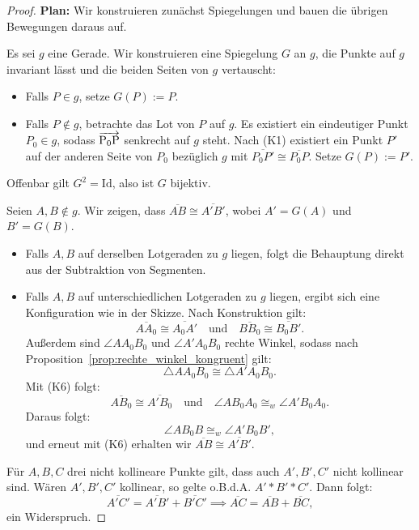 \documentclass[a4paper,12pt]{article}
\theoremstyle{break}
\begin{document}
\begin{proof}
\textbf{Plan:} Wir konstruieren zunächst Spiegelungen und bauen die übrigen Bewegungen daraus auf.

Es sei \(g\) eine Gerade. Wir konstruieren eine Spiegelung \(G\) an \(g\), die Punkte auf \(g\) invariant lässt und die beiden Seiten von \(g\) vertauscht:
\begin{itemize}
    \item Falls \(P \in g\), setze \(G(P) := P\).
    \item Falls \(P \notin g\), betrachte das Lot von \(P\) auf \(g\). Es existiert ein eindeutiger Punkt \(P_0 \in g\), sodass \(\overrightarrow{\rm P_0P}\) senkrecht auf \(g\) steht.  
    Nach (K1) existiert ein Punkt \(P'\) auf der anderen Seite von \(P_0\) bezüglich \(g\) mit \(\overline{P_0P'} \cong \overline{P_0P}\). Setze \(G(P) := P'\).
\end{itemize}

Offenbar gilt \(G^2 = \text{Id}\), also ist \(G\) bijektiv.  

Seien \(A, B \notin g\). Wir zeigen, dass \(\overline{AB} \cong \overline{A'B'}\), wobei \(A' = G(A)\) und \(B' = G(B)\).
\begin{itemize}
    \item Falls \(A, B\) auf derselben Lotgeraden zu \(g\) liegen, folgt die Behauptung direkt aus der Subtraktion von Segmenten.
    \item Falls \(A, B\) auf unterschiedlichen Lotgeraden zu \(g\) liegen, ergibt sich eine Konfiguration wie in der Skizze.  
    Nach Konstruktion gilt:
    \[
    \overline{AA_0} \cong \overline{A_0A'} \quad \text{und} \quad \overline{BB_0} \cong \overline{B_0B'}.
    \]
    Außerdem sind \(\angle AA_0B_0\) und \(\angle A'A_0B_0\) rechte Winkel, sodass nach Proposition~\ref{prop:rechte_winkel_kongruent} gilt:
    \[
    \triangle AA_0B_0 \cong \triangle A'A_0B_0.
    \]
    Mit (K6) folgt:
    \[
    \overline{AB_0} \cong \overline{A'B_0} \quad \text{und} \quad \angle AB_0A_0 \cong_w \angle A'B_0A_0.
    \]
    Daraus folgt:
    \[
    \angle AB_0B \cong_w \angle A'B_0B',
    \]
    und erneut mit (K6) erhalten wir \(\overline{AB} \cong \overline{A'B'}\).
\end{itemize}

Für \(A, B, C\) drei nicht kollineare Punkte gilt, dass auch \(A', B', C'\) nicht kollinear sind. Wären \(A', B', C'\) kollinear, so gelte o.B.d.A. \(A' * B' * C'\). Dann folgt:
\[
\overline{A'C'} = \overline{A'B'} + \overline{B'C'} \implies \overline{AC} = \overline{AB} + \overline{BC},
\]
ein Widerspruch.  


\end{proof}
\end{document}
